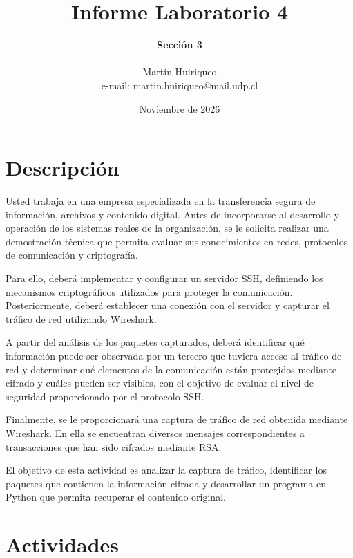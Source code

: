 \documentclass[letter,12pt]{article}
\begin{document}
%
   \title{\Huge{Informe Laboratorio 4}}

   \author{\textbf{Sección 3} \\  \\Martín Huiriqueo \\ e-mail: martin.huiriqueo@mail.udp.cl}
         
   \date{Noviembre de 2026}

   \maketitle
   \newpage
   
   \tableofcontents
   \newpage

\section{Descripción}
Usted trabaja en una empresa especializada en la transferencia segura de información, archivos y contenido digital. Antes de incorporarse al desarrollo y operación de los sistemas reales de la organización, se le solicita realizar una demostración técnica que permita evaluar sus conocimientos en redes, protocolos de comunicación y criptografía.

Para ello, deberá implementar y configurar un servidor SSH, definiendo los mecanismos criptográficos utilizados para proteger la comunicación. Posteriormente, deberá establecer una conexión con el servidor y capturar el tráfico de red utilizando Wireshark.

A partir del análisis de los paquetes capturados, deberá identificar qué información puede ser observada por un tercero que tuviera acceso al tráfico de red y determinar qué elementos de la comunicación están protegidos mediante cifrado y cuáles pueden ser visibles, con el objetivo de evaluar el nivel de seguridad proporcionado por el protocolo SSH.

Finalmente, se le proporcionará una captura de tráfico de red obtenida mediante Wireshark. En ella se encuentran diversos mensajes correspondientes a transacciones que han sido cifrados mediante RSA.

El objetivo de esta actividad es analizar la captura de tráfico, identificar los paquetes que contienen la información cifrada y desarrollar un programa en Python que permita recuperar el contenido original.

\section{Actividades}
\end{document}
